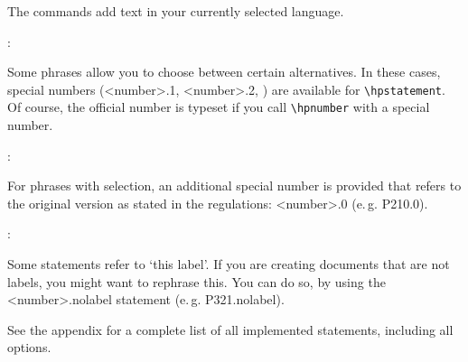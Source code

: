 \documentclass[a4paper,notitlepage,parskip=half]{scrreprt}
\begin{document}
\noindent The commands add text in your currently selected language.
\bigskip

\begin{addmargin}[1em]{0em}
\begin{SideBySideExample}[xrightmargin=7cm]
  :
  \hpstatement{}
\end{SideBySideExample}
\end{addmargin}
\bigskip

\noindent Some phrases allow you to choose between certain alternatives. In
these cases, special numbers (<number>.1, <number>.2, \textellipsis) are
available for \verb|\hpstatement|. Of course, the official number is typeset if
you call \verb|\hpnumber| with a special number. \bigskip

\begin{addmargin}[1em]{0em}
\begin{SideBySideExample}[xrightmargin=7cm]
  :
  \hpstatement{}
\end{SideBySideExample}
\end{addmargin}
\bigskip

\noindent For phrases with selection, an additional special number is provided
that refers to the original version as stated in the regulations: <number>.0
(e.\,g. P210.0).
\bigskip

\begin{addmargin}[1em]{0em}
\begin{SideBySideExample}[xrightmargin=7cm]
  :
  \hpstatement{}
\end{SideBySideExample}
\end{addmargin}
\bigskip

\noindent Some statements refer to `this label'. If you are creating documents
that are not labels, you might want to rephrase this. You can do so, by using
the <number>.nolabel statement (e.\,g. P321.nolabel). \bigskip

See the appendix for a complete list of all implemented statements, including
all options.
\end{document}
